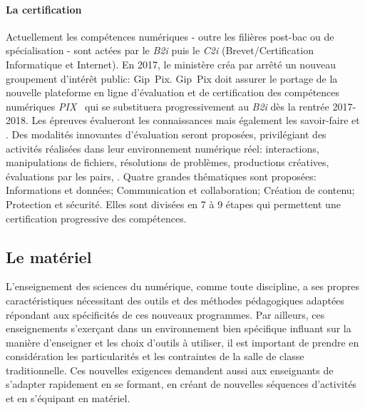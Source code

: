         \paragraph{La certification}\label{sec:certif}
            Actuellement les compétences numériques - outre les filières post-bac ou de spécialisation - sont actées par le \textit{B2i} puis le \textit{C2i} (Brevet/Certification Informatique et Internet). En 2017, le ministère créa par arrêté un nouveau groupement d’intérêt public: Gip~Pix. Gip~Pix doit assurer le portage de la nouvelle plateforme en ligne d’évaluation et de certification des compétences numériques \textit{PIX}~ qui se substituera progressivement au \textit{B2i} dès la rentrée 2017-2018.
            Les épreuves évalueront les connaissances mais également les savoir-faire et . Des modalités innovantes d’évaluation seront proposées, privilégiant des activités réalisées dans leur environnement numérique réel: interactions, manipulations de  fichiers, résolutions de problèmes, productions créatives, évaluations par les pairs, \etc.
            Quatre grandes thématiques sont proposées: Informations et données; Communication et collaboration; Création de contenu; Protection et sécurité. Elles sont divisées en 7 à 9 étapes qui permettent une certification progressive des compétences.
    \subsection{Le matériel}\label{sec:materiel}
            L'enseignement des sciences du numérique, comme toute discipline, a ses propres caractéristiques nécessitant des outils et des méthodes pédagogiques adaptées répondant aux spécificités de ces nouveaux programmes. 
            Par ailleurs, ces enseignements s'exerçant dans un environnement bien spécifique influant sur la manière d'enseigner et les choix d'outils à utiliser, il est important de prendre en considération les particularités et les contraintes de la salle de classe traditionnelle. 
            Ces nouvelles exigences demandent aussi aux enseignants de s'adapter rapidement en se formant, en créant de nouvelles séquences d'activités et en s'équipant en matériel.
